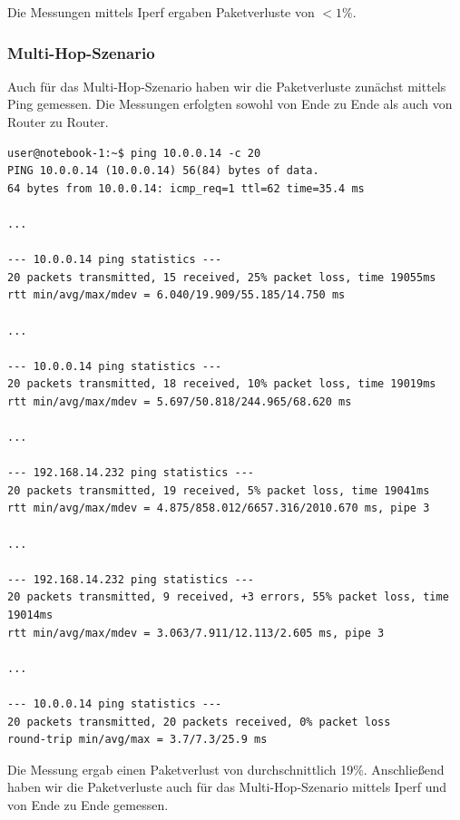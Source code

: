 \documentclass[a4paper,10pt]{article}
\begin{document}
Die Messungen mittels Iperf ergaben Paketverluste von $< 1\%$.

\subsubsection*{Multi-Hop-Szenario}

Auch für das Multi-Hop-Szenario haben wir die Paketverluste zunächst mittels Ping gemessen.
Die Messungen erfolgten sowohl von Ende zu Ende als auch von Router zu Router.

\begin{lstlisting}
user@notebook-1:~$ ping 10.0.0.14 -c 20
PING 10.0.0.14 (10.0.0.14) 56(84) bytes of data.
64 bytes from 10.0.0.14: icmp_req=1 ttl=62 time=35.4 ms

...

--- 10.0.0.14 ping statistics --- 
20 packets transmitted, 15 received, 25% packet loss, time 19055ms
rtt min/avg/max/mdev = 6.040/19.909/55.185/14.750 ms

...

--- 10.0.0.14 ping statistics ---
20 packets transmitted, 18 received, 10% packet loss, time 19019ms
rtt min/avg/max/mdev = 5.697/50.818/244.965/68.620 ms

...

--- 192.168.14.232 ping statistics ---
20 packets transmitted, 19 received, 5% packet loss, time 19041ms
rtt min/avg/max/mdev = 4.875/858.012/6657.316/2010.670 ms, pipe 3

...

--- 192.168.14.232 ping statistics ---
20 packets transmitted, 9 received, +3 errors, 55% packet loss, time 19014ms
rtt min/avg/max/mdev = 3.063/7.911/12.113/2.605 ms, pipe 3

...

--- 10.0.0.14 ping statistics ---
20 packets transmitted, 20 packets received, 0% packet loss
round-trip min/avg/max = 3.7/7.3/25.9 ms
\end{lstlisting}

Die Messung ergab einen Paketverlust von durchschnittlich 19\%.
Anschließend haben wir die Paketverluste auch für das Multi-Hop-Szenario mittels Iperf und von Ende zu Ende gemessen.
 
\end{document}

